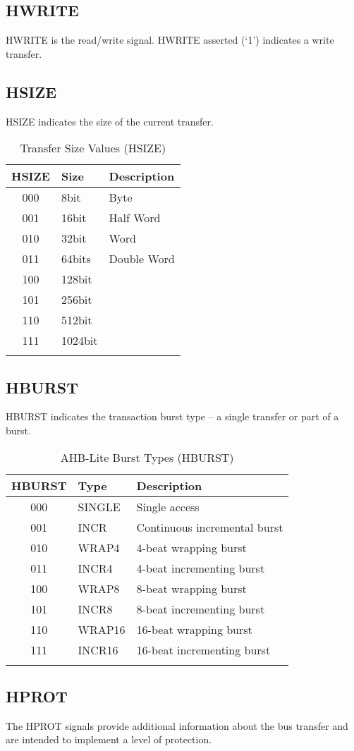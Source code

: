 \subsection{HWRITE}\label{hwrite}

HWRITE is the read/write signal. HWRITE asserted (`1') indicates a write
transfer.

\subsection{HSIZE}\label{hsize}

HSIZE indicates the size of the current transfer.

\begin{longtable}[]{@{}cll@{}}
\toprule
HSIZE & Size & Description\tabularnewline
\midrule
\endhead
000 & 8bit & Byte\tabularnewline
001 & 16bit & Half Word\tabularnewline
010 & 32bit & Word\tabularnewline
011 & 64bits & Double Word\tabularnewline
100 & 128bit &\tabularnewline
101 & 256bit &\tabularnewline
110 & 512bit &\tabularnewline
111 & 1024bit &\tabularnewline
\bottomrule
\caption{Transfer Size Values
	(HSIZE)}
\end{longtable}

\subsection{HBURST}\label{hburst}

HBURST indicates the transaction burst type -- a single transfer or part
of a burst.

\begin{longtable}[]{@{}cll@{}}
\toprule
HBURST & Type & Description\tabularnewline
\midrule
\endhead
000 & SINGLE & Single access\tabularnewline
001 & INCR & Continuous incremental burst\tabularnewline
010 & WRAP4 & 4-beat wrapping burst\tabularnewline
011 & INCR4 & 4-beat incrementing burst\tabularnewline
100 & WRAP8 & 8-beat wrapping burst\tabularnewline
101 & INCR8 & 8-beat incrementing burst\tabularnewline
110 & WRAP16 & 16-beat wrapping burst\tabularnewline
111 & INCR16 & 16-beat incrementing burst\tabularnewline
\bottomrule
\caption{AHB-Lite Burst Types (HBURST)}
\end{longtable}

\subsection{HPROT}\label{hprot}

The HPROT signals provide additional information about the bus transfer
and are intended to implement a level of protection.

